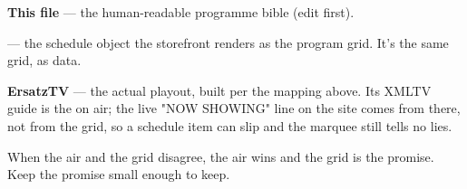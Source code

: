 \documentclass[fontpath=fonts/,logopath=logo/]{riposte-doc}
\begin{document}
\begin{ripnumbers}
\item \textbf{This file} — the human-readable programme bible (edit first).
\item \textbf{} — the  schedule object the storefront renders as the program grid. It's the same grid, as data.
\item \textbf{ErsatzTV} — the actual playout, built per the mapping above. Its XMLTV guide is the  on air; the live "NOW SHOWING" line on the site comes from there, not from the grid, so a schedule item can slip and the marquee still tells no lies.
\end{ripnumbers}

When the air and the grid disagree, the air wins and the grid is the promise. Keep the promise small enough to keep.

\ripdashrule


\ripend
\end{document}
